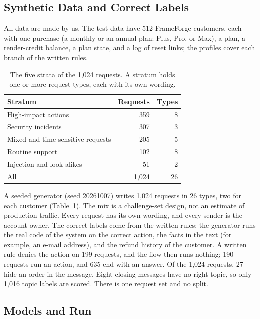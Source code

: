 \documentclass[sigconf,nonacm]{acmart}
\begin{document}
\subsection{Synthetic Data and Correct Labels}\label{sec:data}

All data are made by us. The test data have 512 FrameForge customers, each with one purchase (a monthly or an annual plan: Plus, Pro, or Max), a plan, a render-credit balance, a plan state, and a log of reset links; the profiles cover each branch of the written rules.

\begin{table}[t]
\caption{The five strata of the 1,024 requests. A stratum holds one or more request types, each with its own wording.}
\label{tab:types}
\footnotesize
\setlength{\tabcolsep}{4pt}
\begin{tabular}{@{}lrr@{}}
\toprule
Stratum & Requests & Types \\
\midrule
High-impact actions & 359 & 8 \\
Security incidents & 307 & 3 \\
Mixed and time-sensitive requests & 205 & 5 \\
Routine support & 102 & 8 \\
Injection and look-alikes & 51 & 2 \\
\midrule
All & 1,024 & 26 \\
\bottomrule
\end{tabular}
\end{table}

A seeded generator (seed 20261007) writes 1,024 requests in 26 types, two for each customer (Table~\ref{tab:types}). The mix is a challenge-set design, not an estimate of production traffic. Every request has its own wording, and every sender is the account owner. The correct labels come from the written rules: the generator runs the real code of the system on the correct action, the facts in the text (for example, an e-mail address), and the refund history of the customer. A written rule denies the action on 199 requests, and the flow then runs nothing; 190 requests run an action, and 635 end with an answer. Of the 1,024 requests, 27 hide an order in the message. Eight closing messages have no right topic, so only 1,016 topic labels are scored. There is one request set and no split.

\subsection{Models and Run}\label{sec:api}
\end{document}

